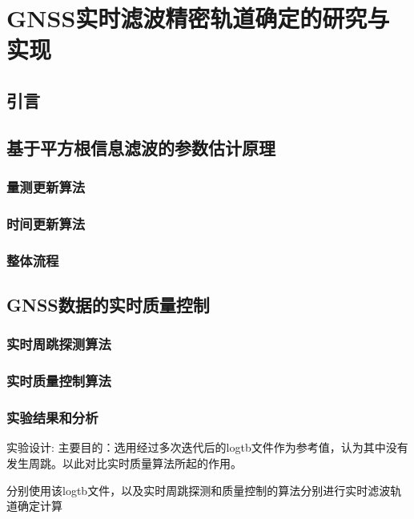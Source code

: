 
\chapter{GNSS实时滤波精密轨道确定的研究与实现}

\section{引言}

\section{基于平方根信息滤波的参数估计原理}

\subsection{量测更新算法}

\subsection{时间更新算法}

\subsection{整体流程}

\section{GNSS数据的实时质量控制}

\subsection{实时周跳探测算法}

\subsection{实时质量控制算法}

\subsection{实验结果和分析}

实验设计:
主要目的：选用经过多次迭代后的log\underline{\space}tb文件作为参考值，认为其中没有发生周跳。以此对比实时质量算法所起的作用。

分别使用该log\underline{\space}tb文件，以及实时周跳探测和质量控制的算法分别进行实时滤波轨道确定计算


